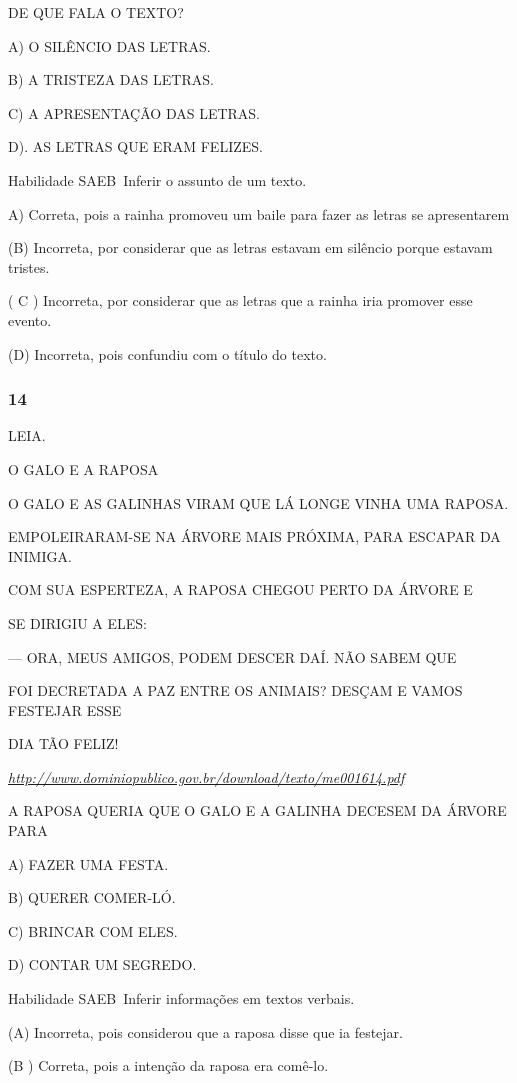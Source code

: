 \begin{escola}
DE QUE FALA O TEXTO?

A) O SILÊNCIO DAS LETRAS.

B) A TRISTEZA DAS LETRAS.

C) A APRESENTAÇÃO DAS LETRAS.

D). AS LETRAS QUE ERAM FELIZES.

Habilidade SAEB~Inferir o assunto de um texto.

A) Correta, pois a rainha promoveu um baile para fazer as letras se
apresentarem

(B) Incorreta, por considerar que as letras estavam em silêncio porque
estavam tristes.

( C ) Incorreta, por considerar que as letras que a rainha iria promover
esse evento.

(D) Incorreta, pois confundiu com o título do texto.

\subsubsection{14}\label{section-86}

LEIA.

O GALO E A RAPOSA

O GALO E AS GALINHAS VIRAM QUE LÁ LONGE VINHA UMA RAPOSA.

EMPOLEIRARAM-SE NA ÁRVORE MAIS PRÓXIMA, PARA ESCAPAR DA INIMIGA.

COM SUA ESPERTEZA, A RAPOSA CHEGOU PERTO DA ÁRVORE E

SE DIRIGIU A ELES:

--- ORA, MEUS AMIGOS, PODEM DESCER DAÍ. NÃO SABEM QUE

FOI DECRETADA A PAZ ENTRE OS ANIMAIS? DESÇAM E VAMOS FESTEJAR ESSE

DIA TÃO FELIZ!

\href{http://www.dominiopublico.gov.br/download/texto/me001614.pdf}{\emph{http://www.dominiopublico.gov.br/download/texto/me001614.pdf}}

A RAPOSA QUERIA QUE O GALO E A GALINHA DECESEM DA ÁRVORE PARA

A) FAZER UMA FESTA.

B) QUERER COMER-LÓ.

C) BRINCAR COM ELES.

D) CONTAR UM SEGREDO.

Habilidade SAEB~Inferir informações em textos verbais.

(A) Incorreta, pois considerou que a raposa disse que ia festejar.

(B ) Correta, pois a intenção da raposa era comê-lo.


\end{escola}
